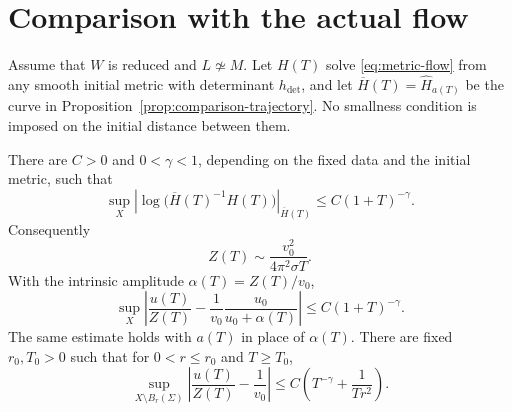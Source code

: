\section{Comparison with the actual flow}
\label{sec:actual-comparison}

Assume that \(W\) is reduced and \(L\not\simeq M\).
Let \(H(T)\) solve \eqref{eq:metric-flow} from any smooth
initial metric with determinant \(h_{\det}\), and let
\(\overline H(T)=\widehat H_{a(T)}\) be the curve in
Proposition~\ref{prop:comparison-trajectory}. No smallness
condition is imposed on the initial distance between them.

\begin{theorem}\label{thm:actual-comparison}
There are \(C>0\) and \(0<\gamma<1\), depending on the
fixed data and the initial metric, such that
\begin{equation}\label{eq:distance-decay}
 \sup_X\left|\log\bigl(\overline H(T)^{-1}H(T)\bigr)\right|_{\overline H(T)}
 \le C(1+T)^{-\gamma}.
\end{equation}
Consequently
\begin{equation}\label{eq:actual-mass}
 Z(T)\sim\frac{v_0^2}{4\pi^2\sigma T}.
\end{equation}
With the intrinsic amplitude \(\alpha(T)=Z(T)/v_0\),
\begin{equation}\label{eq:global-inclusion-profile}
 \sup_X\left|\frac{u(T)}{Z(T)}
       -\frac1{v_0}\frac{u_0}{u_0+\alpha(T)}\right|
 \le C(1+T)^{-\gamma}.
\end{equation}
The same estimate holds with \(a(T)\) in place of \(\alpha(T)\).
There are fixed \(r_0,T_0>0\) such that for \(0<r\le r_0\)
and \(T\ge T_0\),
\begin{equation}\label{eq:shrinking-exterior}
 \sup_{X\setminus B_r(\Sigma)}
 \left|\frac{u(T)}{Z(T)}-\frac1{v_0}\right|
 \le C\left(T^{-\gamma}+\frac1{Tr^2}\right).
\end{equation}
\end{theorem}

